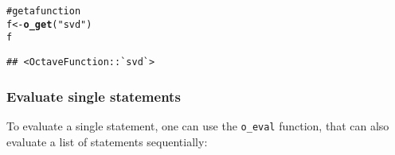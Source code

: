 \documentclass[english,10pt,a4paper]{article}\usepackage{graphicx, color}
\makeatletter
\newcommand{\hlfunctioncall}[1]{\textcolor[rgb]{0.501960784313725,0,0.329411764705882}{\textbf{#1}}}%
\newcommand{\hlstring}[1]{\textcolor[rgb]{0.6,0.6,1}{#1}}%
\newcommand{\hlcomment}[1]{\textcolor[rgb]{0.180392156862745,0.6,0.341176470588235}{#1}}%
\newenvironment{kframe}{%
 \def\at@end@of@kframe{}%
 \ifinner\ifhmode%
  \def\at@end@of@kframe{\end{minipage}}%
  \begin{minipage}{\columnwidth}%
 \fi\fi%
 \def\FrameCommand##1{\hskip\@totalleftmargin \hskip-\fboxsep
 \colorbox{shadecolor}{##1}\hskip-\fboxsep
     \hskip-\linewidth \hskip-\@totalleftmargin \hskip\columnwidth}%
 \MakeFramed {\advance\hsize-\width
   \@totalleftmargin\z@ \linewidth\hsize
   \@setminipage}}%
 {\par\unskip\endMakeFramed%
 \at@end@of@kframe}
\newenvironment{knitrout}{}{} %
\let\code=\texttt
\makeatother
\begin{document}
\begin{knitrout}
\begin{kframe}
{\ttfamily\noindent\bfseries\color{errorcolor}{\#\# Error: RcppOctave::o\_get - Could not find an Octave object named 'aa'.\\\#\#\ \ \ \ \ \ \ \ Match(es): aaa aab}}\begin{alltt}
\hlcomment{# get a function}
f <- \hlfunctioncall{o_get}(\hlstring{"svd"})
f
\end{alltt}
\begin{verbatim}
## <OctaveFunction::`svd`>
\end{verbatim}
\end{kframe}
\end{knitrout}


\subsubsection{Evaluate single statements}

To evaluate a single statement, one can use the \code{o\_eval} function, that
can also evaluate a list of statements sequentially:
\end{document}
